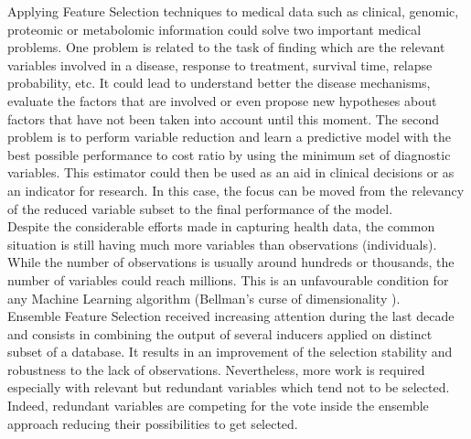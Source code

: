 Applying Feature Selection techniques to medical data such as clinical, genomic, proteomic or metabolomic information could solve two important medical problems. One problem is related to the task of finding which are the relevant variables involved in a disease, response to treatment, survival time, relapse probability, etc. It could lead to understand better the disease mechanisms, evaluate the factors that are involved or even propose new hypotheses about factors that have not been taken into account until this moment. The second problem is to perform variable reduction and learn a predictive model with the best possible performance to cost ratio by using the minimum set of diagnostic variables. This estimator could then be used as an aid in clinical decisions or as an indicator for research. In this case, the focus can be moved from the relevancy of the reduced variable subset to the final performance of the model. 
\\

Despite the considerable efforts made in capturing health data, the common situation is still having much more variables than observations (individuals). While the number of observations is usually around hundreds or thousands, the number of variables could reach millions. This is an unfavourable condition for any Machine Learning algorithm (Bellman's curse of dimensionality \cite{Bellman2015AdaptiveTour}). 
\\

Ensemble Feature Selection received increasing attention during the last decade \cite{Bolon-Canedo2019EnsemblesTrends} \cite{Pes2020EnsembleDomains} \cite{Abeel2009RobustMethods} \cite{BenBrahim2017EnsembleStudy} and consists in combining the output of several inducers applied on distinct subset of a database. It results in an improvement of the selection stability and robustness to the lack of observations. Nevertheless, more work is required especially with relevant but redundant variables which tend not to be selected. 
\\

Indeed, redundant variables are competing for the vote inside the ensemble approach reducing their possibilities to get selected.
\\

